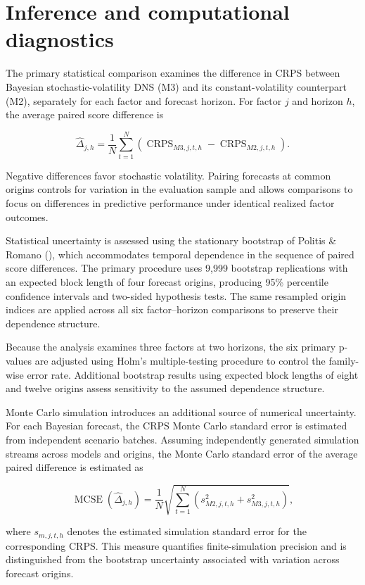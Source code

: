 \documentclass[
  12pt,
  letterpaper,
  DIV=11,
  numbers=noendperiod]{scrreprt}
\begin{document}
\section{Inference and computational
diagnostics}\label{inference-and-computational-diagnostics}

The primary statistical comparison examines the difference in CRPS
between Bayesian stochastic-volatility DNS (M3) and its
constant-volatility counterpart (M2), separately for each factor and
forecast horizon. For factor \(j\) and horizon \(h\), the average paired
score difference is

\[
\widehat{\Delta}_{j,h}
=\frac{1}{N}\sum_{t=1}^{N}
\left(
\operatorname{CRPS}_{M3,j,t,h}
-\operatorname{CRPS}_{M2,j,t,h}
\right).
\]

Negative differences favor stochastic volatility. Pairing forecasts at
common origins controls for variation in the evaluation sample and
allows comparisons to focus on differences in predictive performance
under identical realized factor outcomes.

Statistical uncertainty is assessed using the stationary bootstrap of
Politis \& Romano (), which
accommodates temporal dependence in the sequence of paired score
differences. The primary procedure uses 9,999 bootstrap replications
with an expected block length of four forecast origins, producing 95\%
percentile confidence intervals and two-sided hypothesis tests. The same
resampled origin indices are applied across all six factor--horizon
comparisons to preserve their dependence structure.

Because the analysis examines three factors at two horizons, the six
primary p-values are adjusted using Holm's multiple-testing procedure to
control the family-wise error rate. Additional bootstrap results using
expected block lengths of eight and twelve origins assess sensitivity to
the assumed dependence structure.

Monte Carlo simulation introduces an additional source of numerical
uncertainty. For each Bayesian forecast, the CRPS Monte Carlo standard
error is estimated from independent scenario batches. Assuming
independently generated simulation streams across models and origins,
the Monte Carlo standard error of the average paired difference is
estimated as

\[
\operatorname{MCSE}(\widehat\Delta_{j,h})
=\frac{1}{N}
\sqrt{\sum_{t=1}^{N}
\left(s_{M2,j,t,h}^2+s_{M3,j,t,h}^2\right)},
\]

where \(s_{m,j,t,h}\) denotes the estimated simulation standard error
for the corresponding CRPS. This measure quantifies finite-simulation
precision and is distinguished from the bootstrap uncertainty associated
with variation across forecast origins.
\end{document}
